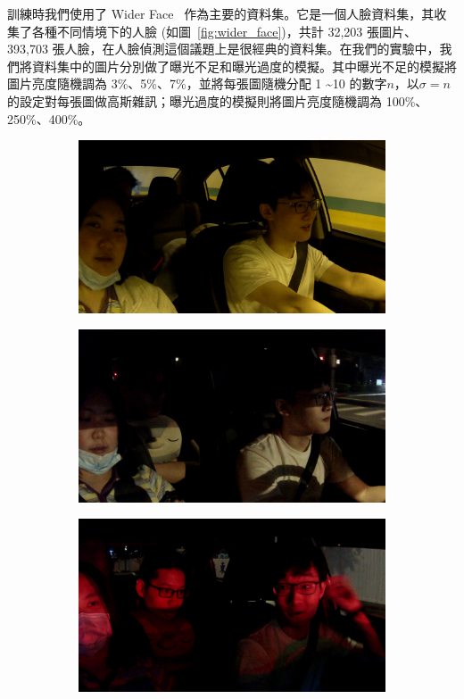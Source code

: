 訓練時我們使用了 Wider Face~\cite{yang2016wider} 作為主要的資料集。它是一個人臉資料集，其收集了各種不同情境下的人臉 (如圖~\ref{fig:wider_face})，共計 32,203 張圖片、393,703 張人臉，在人臉偵測這個議題上是很經典的資料集。在我們的實驗中，我們將資料集中的圖片分別做了曝光不足和曝光過度的模擬。其中曝光不足的模擬將圖片亮度隨機調為 3\%、5\%、7\%，並將每張圖隨機分配 1 \textasciitilde 10 的數字$n$，以$\sigma = n$的設定對每張圖做高斯雜訊；曝光過度的模擬則將圖片亮度隨機調為 100\%、250\%、400\%。

\begin{figure}[t]
\centering
\begin{subfigure}[b]{0.22\textwidth}
    \includegraphics[width=\textwidth]{figures/test_1_1}
\end{subfigure}
\begin{subfigure}[b]{0.22\textwidth}
    \includegraphics[width=\textwidth]{figures/test_2_1}
\end{subfigure}
\begin{subfigure}[b]{0.22\textwidth}
    \includegraphics[width=\textwidth]{figures/test_3_1}

\end{subfigure}
\end{figure}
